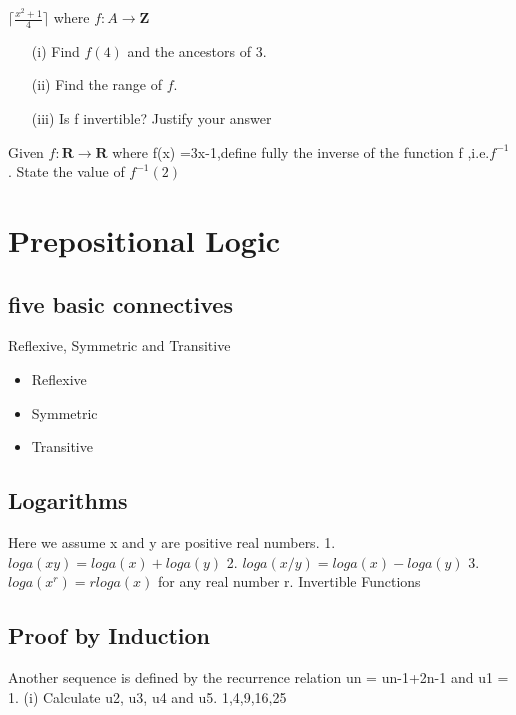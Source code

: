 \documentclass[]{report}
\begin{document}
$\lceil \frac{x^2+1}{4} \rceil$
where $f : A \rightarrow \textbf{Z}$
\begin{itemize}
\item[(i)] Find $f(4)$ and the ancestors of 3.
\item[(ii)] Find the range of $f$.
\item[(iii)] Is f invertible? Justify your answer
\end{itemize}

Given $f : \textbf{R} \rightarrow \textbf{R}$ where f(x) =3x-1,define fully
the inverse of the function f ,i.e.$f^{-1}$. 
State the value of $f^{-1}(2)$


\newpage

\section*{Prepositional Logic}

\subsection{five basic connectives}


Reflexive, Symmetric and Transitive

\begin{itemize} 
\item Reflexive
\item Symmetric
\item Transitive
\end{itemize}

\subsection{Logarithms}


Here we
assume x and y are positive real numbers.
1. $loga(xy) = loga(x) + loga(y)$
2. $loga(x/y)= loga(x) - loga(y)$
3. $loga (x^r) = r loga(x)$ for any real number r.
Invertible Functions

\subsection{Proof by Induction}

Another sequence is defined by the recurrence relation un = un-1+2n-1 and
u1 = 1.
(i) Calculate u2, u3, u4 and u5.
1,4,9,16,25
\end{document}
